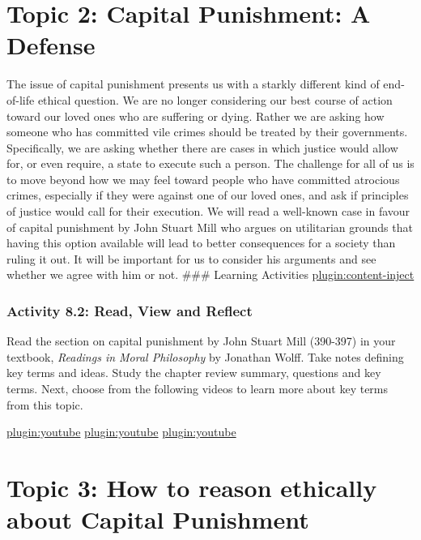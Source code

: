 \documentclass[
]{book}
\begin{document}
\hypertarget{topic-2-capital-punishment-a-defense}{%
\section{Topic 2: Capital Punishment: A Defense}\label{topic-2-capital-punishment-a-defense}}

The issue of capital punishment presents us with a starkly different kind of end-of-life ethical question. We are no longer considering our best course of action toward our loved ones who are suffering or dying. Rather we are asking how someone who has committed vile crimes should be treated by their governments.
Specifically, we are asking whether there are cases in which justice would allow for, or even require, a state to execute such a person. The challenge for all of us is to move beyond how we may feel toward people who have committed atrocious crimes, especially if they were against one of our loved ones, and ask if principles of justice would call for their execution.
We will read a well-known case in favour of capital punishment by John Stuart Mill who argues on utilitarian grounds that having this option available will lead to better consequences for a society than ruling it out. It will be important for us to consider his arguments and see whether we agree with him or not.
\#\#\# Learning Activities
\href{../_8-2}{plugin:content-inject}

\hypertarget{activity-8.2-read-view-and-reflect}{%
\subsubsection{Activity 8.2: Read, View and Reflect}\label{activity-8.2-read-view-and-reflect}}

Read the section on capital punishment by John Stuart Mill (390-397) in your
textbook, \emph{Readings in Moral Philosophy} by Jonathan Wolff. Take notes defining
key terms and ideas. Study the chapter review summary, questions and key terms.
Next, choose from the following videos to learn more about key terms from this topic.

\href{https://www.youtube.com/watch?v=8dnVZibrV6g}{plugin:youtube}
\href{https://www.youtube.com/watch?v=H0CTHVCkm90}{plugin:youtube}
\href{https://www.youtube.com/watch?v=sujAXjmjrpA}{plugin:youtube}

\hypertarget{topic-3-how-to-reason-ethically-about-capital-punishment}{%
\section{Topic 3: How to reason ethically about Capital Punishment}\label{topic-3-how-to-reason-ethically-about-capital-punishment}}
\end{document}
